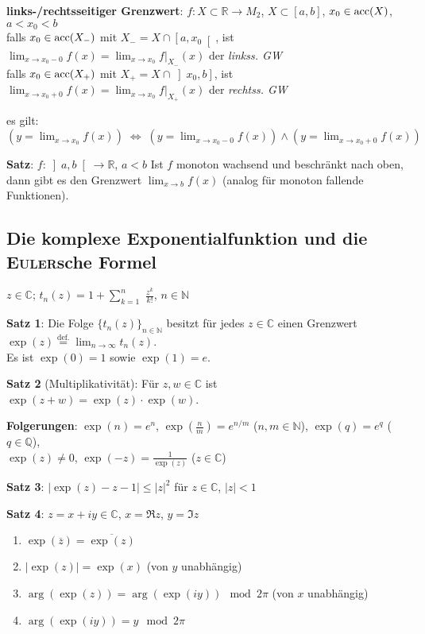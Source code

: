 \linie

\textbf{links-/rechtsseitiger Grenzwert}:
$f: X \subset \mathbb{R} \rightarrow M_2$, $X \subset [a,b]$,
$x_0 \in \operatorname{acc}(X)$, $a < x_0 < b$ \\
falls $x_0 \in \operatorname{acc}(X_-)$ mit $X_- = X \cap \left[a,x_0\right[$, ist
$\lim_{x \to x_0 - 0} f(x) = \lim_{x \to x_0} f|_{X_-}(x)$ der
\emph{linkss. GW} \\
falls $x_0 \in \operatorname{acc}(X_+)$ mit $X_+ = X \cap \left]x_0,b\right]$, ist
$\lim_{x \to x_0 + 0} f(x) = \lim_{x \to x_0} f|_{X_+}(x)$ der
\emph{rechtss. GW}

es gilt: $(y = \lim_{x \to x_0} f(x)) \;\Leftrightarrow\;
(y = \lim_{x \to x_0 - 0} f(x)) \land (y = \lim_{x \to x_0 + 0} f(x))$

\textbf{Satz}: $f: \left]a,b\right[ \rightarrow \mathbb{R}$, $a < b$ \qquad
Ist $f$ monoton wachsend und beschränkt nach oben, dann gibt es den Grenzwert
$\lim_{x \to b} f(x)$
(analog für monoton fallende Funktionen).

\subsection{%
    Die komplexe Exponentialfunktion und die \textsc{Euler}sche Formel%
}

$z \in \mathbb{C}$; \quad $t_n(z) = 1 + \sum_{k=1}^n$
{\large $\frac{z^k}{k!}$}, \quad $n \in \mathbb{N}$

\textbf{Satz 1}: Die Folge $\{t_n(z)\}_{n \in \mathbb{N}}$ besitzt für jedes
$z \in \mathbb{C}$ einen Grenzwert
$\exp(z) \overset{\text{def.}}{=} \lim_{n \to \infty} t_n(z)$. \\
Es ist $\exp(0) = 1$ sowie $\exp(1) = e$.

\textbf{Satz 2} (Multiplikativität): Für $z, w \in \mathbb{C}$ ist
$\exp(z + w) = \exp(z) \cdot \exp(w)$.

\textbf{Folgerungen}: $\exp(n) = e^n$, $\exp(\frac{n}{m}) = e^{n/m}$
($n, m \in \mathbb{N}$), $\exp(q) = e^q$ ($q \in \mathbb{Q}$), \\
$\exp(z) \not= 0$, $\exp(-z) = \frac{1}{\exp(z)}$ ($z \in \mathbb{C}$)

\textbf{Satz 3}: $|\exp(z) - z - 1| \le |z|^2$ für $z \in \mathbb{C}$,
$|z| < 1$

\textbf{Satz 4}: $z = x + iy \in \mathbb{C}$, $x = \Re z$, $y = \Im z$

\begin{enumerate}
    \item $\exp(\overline{z}) = \overline{\exp(z)}$

    \item $|\exp(z)| = \exp(x)$ \quad (von $y$ unabhängig)

    \item $\arg(\exp(z)) = \arg(\exp(iy)) \mod 2\pi$ \quad (von $x$ unabhängig)

    \item $\arg(\exp(iy)) = y \mod 2\pi$
\end{enumerate}

